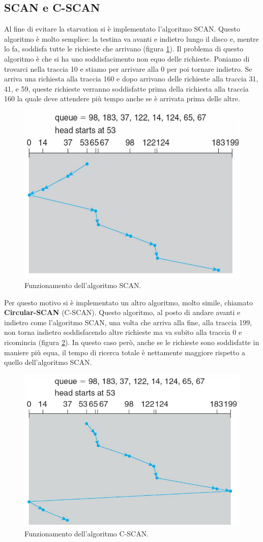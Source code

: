 \subsection{SCAN e C-SCAN}\label{scan}
Al fine di evitare la starvation si è implementato l'algoritmo SCAN. Questo algoritmo è molto semplice: la testina va avanti e indietro lungo il disco e, mentre lo fa, soddisfa tutte le richieste che arrivano (figura \ref{fig:SCAN}). Il problema di questo algoritmo è che si ha uno soddisfacimento non equo delle richieste. Poniamo di trovarci nella traccia 10 e stiamo per arrivare alla 0 per poi tornare indietro. Se arriva una richiesta alla traccia 160 e dopo arrivano delle richieste alla traccia 31, 41, e 59, queste richieste verranno soddisfatte prima della richiesta alla traccia 160 la quale deve attendere più tempo anche se è arrivata prima delle altre.
\begin{figure}[h]
    \centering
    \includegraphics[width = .5\textwidth]{../res/imgs/mass memory/SCAN.png}
    \caption{Funzionamento dell'algoritmo SCAN.}
    \label{fig:SCAN}
\end{figure}

\noindent Per questo motivo si è implementato un altro algoritmo, molto simile, chiamato \textbf{Circular-SCAN} (C-SCAN). Questo algoritmo, al posto di andare avanti e indietro come l'algoritmo SCAN, una volta che arriva alla fine, alla traccia 199, non torna indietro soddisfacendo altre richieste ma va subito alla traccia 0 e ricomincia (figura \ref{fig:C-SCAN}). In questo caso però, anche se le richieste sono soddisfatte in maniere più equa, il tempo di ricerca totale è nettamente maggiore rispetto a quello dell'algoritmo SCAN.
\begin{figure}[h]
    \centering
    \includegraphics[width = .5\textwidth]{../res/imgs/mass memory/C-SCAN.png}
    \caption{Funzionamento dell'algoritmo C-SCAN.}
    \label{fig:C-SCAN}
\end{figure}

